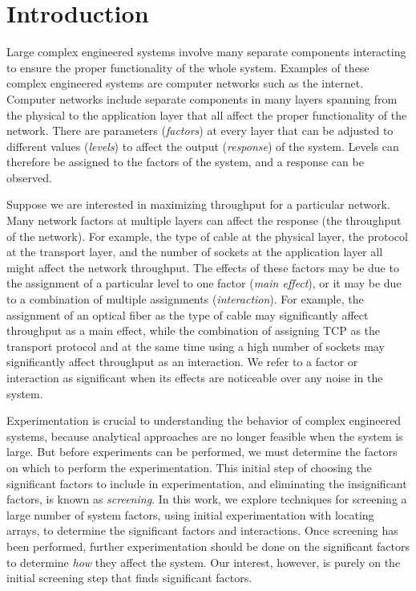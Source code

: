 \chapter{Introduction} \label{chptr:introduction}

Large complex engineered systems involve many separate components interacting to ensure the proper functionality of the whole system.
Examples of these complex engineered systems are computer networks such as the internet.
Computer networks include separate components in many layers spanning from the physical to the application layer that all affect the proper functionality of the network.
There are parameters ({\em factors}) at every layer that can be adjusted to different values ({\em levels}) to affect the output ({\em response}) of the system.
Levels can therefore be assigned to the factors of the system, and a response can be observed.

Suppose we are interested in maximizing throughput for a particular network.
Many network factors at multiple layers can affect the response (the throughput of the network).
For example, the type of cable at the physical layer, the protocol at the transport layer, and the number of sockets at the application layer all might affect the network throughput.
The effects of these factors may be due to the assignment of a particular level to one factor ({\em main effect}), or it may be due to a combination of multiple assignments ({\em interaction}).
For example, the assignment of an optical fiber as the type of cable may significantly affect throughput as a main effect, while the combination of assigning TCP as the transport protocol and at the same time using a high number of sockets may significantly affect throughput as an interaction.
We refer to a factor or interaction as significant when its effects are noticeable over any noise in the system.

Experimentation is crucial to understanding the behavior of complex engineered systems, because analytical approaches are no longer feasible when the system is large.
But before experiments can be performed, we must determine the factors on which to perform the experimentation.
This initial step of choosing the significant factors to include in experimentation, and eliminating the insignificant factors, is known as {\em screening}.
In this work, we explore techniques for screening a large number of system factors, using initial experimentation with locating arrays, to determine the significant factors and interactions.
Once screening has been performed, further experimentation should be done on the significant factors to determine {\em how} they affect the system.
Our interest, however, is purely on the initial screening step that finds significant factors.

